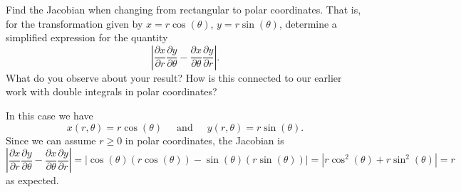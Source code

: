 \begin{activity} \label{A:11.9.2} Find the Jacobian when changing from rectangular to polar coordinates.  That is, for the transformation given by $x = r\cos(\theta)$, $y = r\sin(\theta)$, determine a simplified expression for the quantity 
$$\left|\frac{\partial x}{\partial r} \frac{\partial y}{\partial \theta} - \frac{\partial x}{\partial \theta} \frac{\partial y}{\partial r}\right|.$$
What do you observe about your result?  How is this connected to our earlier work with double integrals in polar coordinates?
\end{activity}
\begin{smallhint}

\end{smallhint}
\begin{bighint}

\end{bighint}
\begin{activitySolution}
In this case we have
\[x(r, \theta) = r \cos(\theta) \ \ \ \ \ \text{ and } \ \ \ \ \ y(r, \theta) = r \sin(\theta).\]
Since we can assume $r \geq 0$ in polar coordinates, the Jacobian is
\[\left|\frac{\partial x}{\partial r} \frac{\partial y}{\partial \theta} - \frac{\partial x}{\partial \theta} \frac{\partial y}{\partial r}\right| = \left|\cos(\theta)(r\cos(\theta)) - \sin(\theta)(r\sin(\theta))\right| = \left|r\cos^2(\theta) + r\sin^2(\theta)\right| = r\]
as expected.
\end{activitySolution}
\aftera
